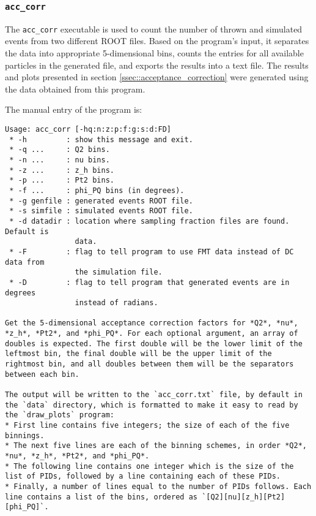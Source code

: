 \subsubsection{\texttt{acc\_corr}}
\label{sssec::acc_corr}
    The \texttt{acc\_corr} executable is used to count the number of thrown and simulated events from two different ROOT files.
    Based on the program's input, it separates the data into appropriate 5-dimensional bins, counts the entries for all available particles in the generated file, and exports the results into a text file.
    The results and plots presented in section \ref{ssec::acceptance_correction} were generated using the data obtained from this program.

    The manual entry of the program is:
    \begin{lstlisting}
Usage: acc_corr [-hq:n:z:p:f:g:s:d:FD]
 * -h         : show this message and exit.
 * -q ...     : Q2 bins.
 * -n ...     : nu bins.
 * -z ...     : z_h bins.
 * -p ...     : Pt2 bins.
 * -f ...     : phi_PQ bins (in degrees).
 * -g genfile : generated events ROOT file.
 * -s simfile : simulated events ROOT file.
 * -d datadir : location where sampling fraction files are found. Default is
                data.
 * -F         : flag to tell program to use FMT data instead of DC data from
                the simulation file.
 * -D         : flag to tell program that generated events are in degrees
                instead of radians.

Get the 5-dimensional acceptance correction factors for *Q2*, *nu*, *z_h*, *Pt2*, and *phi_PQ*. For each optional argument, an array of doubles is expected. The first double will be the lower limit of the leftmost bin, the final double will be the upper limit of the rightmost bin, and all doubles between them will be the separators between each bin.

The output will be written to the `acc_corr.txt` file, by default in the `data` directory, which is formatted to make it easy to read by the `draw_plots` program:
* First line contains five integers; the size of each of the five binnings.
* The next five lines are each of the binning schemes, in order *Q2*, *nu*, *z_h*, *Pt2*, and *phi_PQ*.
* The following line contains one integer which is the size of the list of PIDs, followed by a line containing each of these PIDs.
* Finally, a number of lines equal to the number of PIDs follows. Each line contains a list of the bins, ordered as `[Q2][nu][z_h][Pt2][phi_PQ]`.
    \end{lstlisting}
